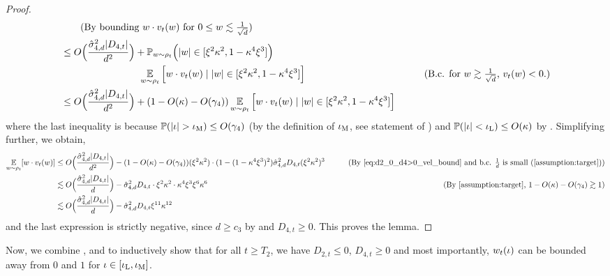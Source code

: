 \begin{proof}
\begin{align}
& \tag{By bounding $\w \cdot \vel_t(\w)$ for $0 \leq \w \lesssim \frac{1}{\sqrt{d}}$} \\
& \leq O\Big(\frac{\sigmaCoeffFour^2 |D_{4, t}|}{d^2}\Big) + \Prob_{\w \sim \rho_t}\Big(|\w| \in [\xi^2 \kappa^2, 1 - \kappa^4 \xi^3]\Big) \\
& \nextlinespace\nextlinespace\nextlinespace \E_{\w \sim \rho_t} \Big[\w \cdot \vel_t(\w) \mid |\w| \in [\xi^2 \kappa^2, 1 - \kappa^4 \xi^3]\Big]
& \tag{B.c. for $\w \gtrsim \frac{1}{\sqrt{d}}$, $\vel_t(\w) < 0$.} \\
& \leq O\Big(\frac{\sigmaCoeffFour^2 |D_{4, t}|}{d^2}\Big) + (1 - O(\kappa) - O(\gamma_4)) \E_{\w \sim \rho_t} \Big[\w \cdot \vel_t(\w) \mid |\w| \in [\xi^2 \kappa^2, 1 - \kappa^4 \xi^3]\Big]
\end{align}
where the last inequality is because $\mathbb{P}(|\iota| > \iota_{\textup{M}}) \leq O(\gamma_4)$ (by the definition of $\iota_{\textup{M}}$, see statement of ) and $\mathbb{P}(|\iota| < \iota_{\textup{L}}) \leq O(\kappa)$ by . Simplifying further, we obtain,
\begin{align}
\E_{\w \sim \rho_t}[\w \cdot \vel_t(\w)]
& \leq O\Big(\frac{\sigmaCoeffFour^2 |D_{4, t}|}{d^2}\Big) - (1 - O(\kappa) - O(\gamma_4)) (\xi^2 \kappa^2) \cdot (1 - (1 - \kappa^4 \xi^3)^2) \sigmaCoeffFour^2 D_{4, t} (\xi^2\kappa^2)^3
& \tag{By \Cref{eq:d2_0_d4>0_vel_bound} and b.c. $\frac{1}{d}$ is small (\Cref{assumption:target})} \\
& \lesssim O\Big(\frac{\sigmaCoeffFour^2 |D_{4, t}|}{d}\Big) - \sigmaCoeffFour^2 D_{4, t} \cdot \xi^2 \kappa^2 \cdot \kappa^4 \xi^3 \xi^6 \kappa^6 
& \tag{By \Cref{assumption:target}, $1 - O(\kappa) - O(\gamma_4) \gtrsim 1$}  \\
& \lesssim O\Big(\frac{\sigmaCoeffFour^2 |D_{4, t}|}{d}\Big) - \sigmaCoeffFour^2 D_{4, t} \xi^{11} \kappa^{12}
\end{align}
and the last expression is strictly negative, since $d \geq c_3$ by  and $D_{4, t} \geq 0$. This proves the lemma.
\end{proof}

Now, we combine ,  and  to inductively show that for all $t \geq T_2$, we have $D_{2, t} \leq 0$, $D_{4, t} \geq 0$ and most importantly, $w_t(\iota)$ can be bounded away from $0$ and $1$ for $\iota \in [\iota_{\textup{L}}, \iota_{\textup{M}}]$.

